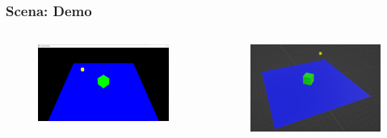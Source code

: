 \begin{frame}
\frametitle{Scena: Demo}

\begin{columns}


\begin{figure}[ht]
    \centering
    \includegraphics[scale=0.14]{images/SlidesScene/SimpleScene.png}
\end{figure}


\begin{figure}[ht]
    \centering
    \includegraphics[scale=0.14]{images/SlidesScene/SimpleSceneSeenSetup.png}
\end{figure}

\end{columns}

\end{frame}

